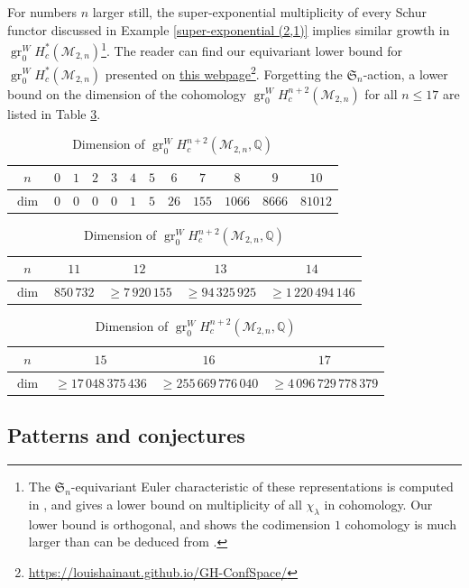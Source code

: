 \documentclass[12pt]{article}
\newcommand{\Q}{\mathbb{Q}}
\newcommand{\SymGroup}[1][n]{\mathfrak{S}_{#1}}
\newcommand{\Specht}[1]{\chi_{#1}}
\newcommand{\ModuliCurve}[1]{\mathcal{M}_{#1}}
\DeclareMathOperator{\gr}{gr}
\theoremstyle{plain}
\theoremstyle{definition}
\theoremstyle{remark}
\begin{document}
For numbers $n$ larger still, the super-exponential multiplicity of every Schur functor discussed in Example \ref{super-exponential (2,1)} implies similar growth in $\gr^W_0 H^*_c(\ModuliCurve{2,n})$\footnote{The $\SymGroup$-equivariant Euler characteristic of these representations is computed in \cite{CFGP}, and gives a lower bound on multiplicity of all $\Specht{\lambda}$ in cohomology. Our lower bound is orthogonal, and shows the codimension $1$ cohomology is much larger than can be deduced from \cite{CFGP}.}. 
The reader can find our equivariant lower bound for $\gr_0^{W} H_c^*(\ModuliCurve{2,n})$ presented on \href{https://louishainaut.github.io/GH-ConfSpace/}{this webpage}\footnote{\url{https://louishainaut.github.io/GH-ConfSpace/}}. Forgetting the $\SymGroup$-action, a lower bound on the dimension of the cohomology $\gr^W_0 H^{n+2}_c(\ModuliCurve{2,n})$ for all $n\leq 17$ are listed in Table \ref{tab:ranks-M2n}.

\begin{table}[h]%
    \centering
    \begin{tabular}{c|c|c|c|c|c|c|c|c|c|c|c}
        $n$ & $0$ & $1$ & $2$ & $3$ & $4$ & $5$ & $6$ & $7$ & $8$ & $9$ & $10$ \\
        \hline
        $\dim$ & $0$ & $0$ & $0$ & $0$ & $1$ & $5$ & $26$ & $155$ & $1066$ & $8666$ & $81012$
    \end{tabular}
    \begin{tabular}{c|c|c|c|c}
        $n$ & $11$ & $12$ & $13$ & $14$ \\
        \hline
        $\dim$ & $850\,732$ & $\geq 7\,920\,155$ & $\geq 94\,325\,925$ & $\geq 1\,220\,494\,146$ 
    \end{tabular}
    \begin{tabular}{c|c|c|c}
        $n$ & $15$ & $16$ & $17$ \\
        \hline
        $\dim$ & $\geq 17\,048\,375\,436$ & $\geq 255\,669\,776\,040$ & $\geq 4\,096\,729\,778\,379$  
    \end{tabular}
    \caption{Dimension of $\gr_0^{W} H_c^{n+2}(\ModuliCurve{2,n}, \Q)$}
    \label{tab:ranks-M2n}
\end{table}

\subsection{Patterns and conjectures}\label{sec:conjectures patterns}
\end{document}

